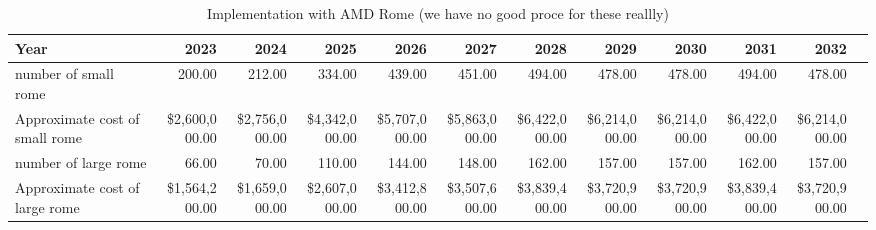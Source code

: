 \tiny \begin{longtable} { |p{}  |r  |r  |r  |r  |r  |r  |r  |r  |r  |r  |r |} 
\caption{Implementation with AMD Rome (we have no good proce for these reallly) \label{tab:opsRome}}\\ 
\hline 
\textbf{Year}&\textbf{2023}&\textbf{2024}&\textbf{2025}&\textbf{2026}&\textbf{2027}&\textbf{2028}&\textbf{2029}&\textbf{2030}&\textbf{2031}&\textbf{2032} \\ \hline
{number of small rome }&{200.00}&{212.00}&{334.00}&{439.00}&{451.00}&{494.00}&{478.00}&{478.00}&{494.00}&{478.00} \\ \hline
{Approximate cost of small rome }&{\$2,600,000.00}&{\$2,756,000.00}&{\$4,342,000.00}&{\$5,707,000.00}&{\$5,863,000.00}&{\$6,422,000.00}&{\$6,214,000.00}&{\$6,214,000.00}&{\$6,422,000.00}&{\$6,214,000.00} \\ \hline
{number of large rome }&{66.00}&{70.00}&{110.00}&{144.00}&{148.00}&{162.00}&{157.00}&{157.00}&{162.00}&{157.00} \\ \hline
{Approximate cost of large rome }&{\$1,564,200.00}&{\$1,659,000.00}&{\$2,607,000.00}&{\$3,412,800.00}&{\$3,507,600.00}&{\$3,839,400.00}&{\$3,720,900.00}&{\$3,720,900.00}&{\$3,839,400.00}&{\$3,720,900.00} \\ \hline
\end{longtable} \normalsize
